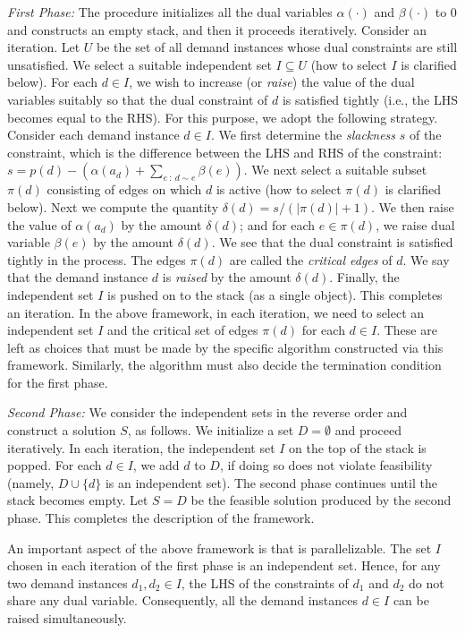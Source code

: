 \documentclass[11pt]{article}
\begin{document}
{\it First Phase: }
The procedure initializes all the dual variables $\alpha(\cdot)$ and $\beta(\cdot)$ to $0$
and constructs an empty stack, and then it proceeds iteratively.
Consider an iteration. Let $U$ be the set of all demand instances whose dual constraints are still unsatisfied.
We select a suitable independent set $I\subseteq U$ (how to select $I$ is clarified below).
For each $d\in I$, we wish to increase (or {\em raise}) the value of the dual variables 
suitably so that the dual constraint of $d$ is satisfied tightly (i.e., the LHS becomes equal to the RHS).
For this purpose, we adopt the following strategy.
Consider each demand instance $d\in I$.
We first determine the {\em slackness} $s$ of the constraint, which is the difference between the 
LHS and RHS of the constraint: 
$s = p(d) - (\alpha(a_d) + \sum_{e~:~d\sim e} \beta(e))$.
We next select a suitable subset $\pi(d)$ consisting of edges on which $d$ is active
(how to select $\pi(d)$ is clarified below).
Next we compute the quantity $\delta(d)=s/(|\pi(d)|+1)$.
We then raise the value of $\alpha(a_d)$ by the amount $\delta(d)$;
and for each $e\in \pi(d)$, we raise dual variable $\beta(e)$ by the amount $\delta(d)$.
We see that the dual constraint is satisfied tightly in the process.
The edges $\pi(d)$ are called the {\em critical edges} of $d$.
We say that the demand instance $d$ is {\em raised} by the amount $\delta(d)$.
Finally, the independent set $I$ is pushed on to the stack (as a single object).
This completes an iteration.
In the above framework, in each iteration, we need to select
an independent set $I$ and the critical set of edges $\pi(d)$ for each $d\in I$. 
These are left as choices that must be made by the
specific algorithm constructed via this framework.
Similarly, the algorithm must also decide the termination condition for the first phase.

{\it Second Phase: } We consider the independent sets in the reverse order
and construct a solution $S$, as follows.
We initialize a set $D=\emptyset$ and proceed iteratively. 
In each iteration, the independent set $I$ on the top of the stack is popped.
For each $d\in I$, we add $d$ to $D$, if doing so does not violate feasibility 
(namely, $D\cup \{d\}$ is an independent set).
The second phase continues until the stack becomes empty.
Let $S=D$ be the feasible solution produced by the second phase.
This completes the description of the framework.

An important aspect of the above framework is that is parallelizable.
The set $I$ chosen in each iteration of the first phase is an independent set.
Hence, for any two demand instances $d_1,d_2\in I$, the LHS of the 
constraints of $d_1$ and $d_2$ do not share any dual variable.
Consequently, all the demand instances $d\in I$ can be raised simultaneously.
\end{document}
